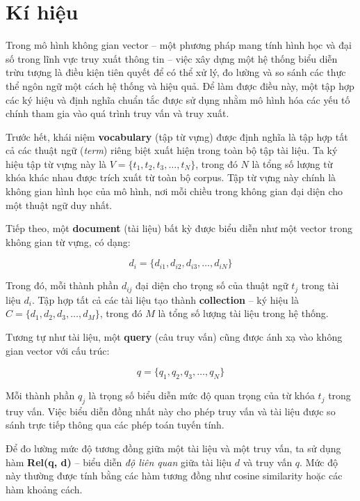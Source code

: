 \section{Kí hiệu}
Trong mô hình không gian vector -- một phương pháp mang tính hình học và đại số trong lĩnh vực truy xuất thông tin -- việc xây dựng một hệ thống biểu diễn trừu tượng là điều kiện tiên quyết để có thể xử lý, đo lường và so sánh các thực thể ngôn ngữ một cách hệ thống và hiệu quả. Để làm được điều này, một tập hợp các ký hiệu và định nghĩa chuẩn tắc được sử dụng nhằm mô hình hóa các yếu tố chính tham gia vào quá trình truy vấn và truy xuất.

Trước hết, khái niệm \textbf{vocabulary} (tập từ vựng) được định nghĩa là tập hợp tất cả các thuật ngữ (\textit{term}) riêng biệt xuất hiện trong toàn bộ tập tài liệu. Ta ký hiệu tập từ vựng này là \(V = \{t_1, t_2, t_3, \dots, t_N\}\), trong đó \(N\) là tổng số lượng từ khóa khác nhau được trích xuất từ toàn bộ corpus. Tập từ vựng này chính là không gian hình học của mô hình, nơi mỗi chiều trong không gian đại diện cho một thuật ngữ duy nhất.

Tiếp theo, một \textbf{document} (tài liệu) bất kỳ được biểu diễn như một vector trong không gian từ vựng, có dạng:

\begin{equation}
    d_i = \{d_{i1}, d_{i2}, d_{i3}, \dots, d_{iN}\}
\end{equation}

Trong đó, mỗi thành phần \(d_{ij}\) đại diện cho trọng số của thuật ngữ \(t_j\) trong tài liệu \(d_i\). Tập hợp tất cả các tài liệu tạo thành \textbf{collection} -- ký hiệu là \(C = \{d_1, d_2, d_3, \dots, d_M\}\), trong đó \(M\) là tổng số lượng tài liệu trong hệ thống.

Tương tự như tài liệu, một \textbf{query} (câu truy vấn) cũng được ánh xạ vào không gian vector với cấu trúc:

\begin{equation}
    q = \{q_1, q_2, q_3, \dots, q_N\}
\end{equation}

Mỗi thành phần \(q_j\) là trọng số biểu diễn mức độ quan trọng của từ khóa \(t_j\) trong truy vấn. Việc biểu diễn đồng nhất này cho phép truy vấn và tài liệu được so sánh trực tiếp thông qua các phép toán tuyến tính.

Để đo lường mức độ tương đồng giữa một tài liệu và một truy vấn, ta sử dụng hàm \textbf{Rel(q, d)} -- biểu diễn \textit{độ liên quan} giữa tài liệu \(d\) và truy vấn \(q\). Mức độ này thường được tính bằng các hàm tương đồng như cosine similarity hoặc các hàm khoảng cách.

